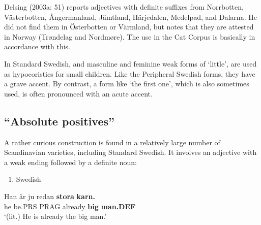 Delsing (2003a: 51) reports adjectives with definite suffixes from Norrbotten, Västerbotten, Ångermanland, Jämtland, Härjedalen, Medelpad, and Dalarna. He did not find them in Österbotten or Värmland, but notes that they are attested in Norway (Trøndelag and Nordmøre). The use in the Cat Corpus is basically in accordance with this. 

In Standard Swedish,  and  masculine and feminine weak forms of  ‘little’, are used as hypocoristics for small children. Like the Peripheral Swedish forms, they have a grave accent. By contrast, a form like  ‘the first one’, which is also sometimes used, is often pronounced with an acute accent. 

\subsection[“Absolute positives”]{\rmfamily “Absolute positives”}
\label{bkm:Ref141250984}%
A rather curious construction is found in a relatively large number of Scandinavian varieties, including Standard Swedish. It involves an adjective with a weak ending followed by a definite noun:

\begin{enumerate} %
\item 
Swedish

\end{enumerate} %
\ea\label{}
\gll Han  är  ju  redan  \textbf{stora}\textbf{  karn.}\\


he  be.PRS  PRAG  already  \textbf{big} \textbf{man.DEF}\\ %


‘(lit.) He is already the big man.’
\z


